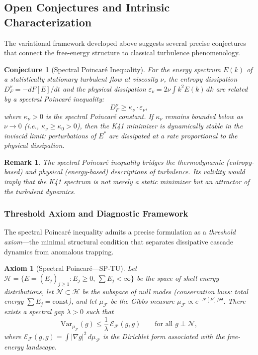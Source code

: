 \documentclass[12pt,a4paper]{article}
\theoremstyle{breakdef}
\theoremstyle{breakplain}
\newtheorem{conjecture}[definition]{Conjecture}
\newtheorem{axiom}[definition]{Axiom}
\theoremstyle{breakdef}
\newtheorem{remark}[definition]{Remark}
\begin{document}
\subsection{Open Conjectures and Intrinsic Characterization}\label{sec:open-conjectures}

The variational framework developed above suggests several precise conjectures
that connect the free-energy structure to classical turbulence phenomenology.

\begin{conjecture}[Spectral Poincaré Inequality]
\label{conj:spectral-poincare}
For the energy spectrum $E(k)$ of a statistically stationary turbulent flow at viscosity $\nu$, the entropy dissipation $D_F^\nu = -dF[E]/dt$ and the physical dissipation $\varepsilon_\nu = 2\nu \int k^2 E(k)\, dk$ are related by a spectral Poincaré inequality:
\[
D_F^\nu \geq \kappa_\nu \cdot \varepsilon_\nu,
\]
where $\kappa_\nu > 0$ is the spectral Poincaré constant. If $\kappa_\nu$ remains bounded below as $\nu \to 0$ (i.e., $\kappa_\nu \geq \kappa_0 > 0$), then the K41 minimizer is dynamically stable in the inviscid limit: perturbations of $E^*$ are dissipated at a rate proportional to the physical dissipation.
\end{conjecture}

\begin{remark}
The spectral Poincaré inequality bridges the thermodynamic (entropy-based) and physical (energy-based) descriptions of turbulence. Its validity would imply that the K41 spectrum is not merely a static minimizer but an attractor of the turbulent dynamics.
\end{remark}

\subsubsection*{Threshold Axiom and Diagnostic Framework}

The spectral Poincaré inequality admits a precise formulation as a \emph{threshold axiom}---the minimal structural condition that separates dissipative cascade dynamics from anomalous trapping.

\begin{axiom}[Spectral Poincaré---SP-TU]\label{ax:sp-tu}
Let $\mathcal{H} = \{E = (E_j)_{j \geq 1} : E_j \geq 0,\, \sum E_j < \infty\}$ be the space of shell energy distributions, let $\mathcal{N} \subset \mathcal{H}$ be the subspace of null modes (conservation laws: total energy $\sum E_j = \mathrm{const}$), and let $\mu_{\mathcal{F}}$ be the Gibbs measure $\mu_{\mathcal{F}} \propto e^{-\mathcal{F}[E]/\Theta}$. There exists a spectral gap $\lambda > 0$ such that
\begin{equation}\label{eq:sp-tu}
  \mathrm{Var}_{\mu_{\mathcal{F}}}(g) \leq \frac{1}{\lambda}\, \mathcal{E}_{\mathcal{F}}(g, g) \qquad \text{for all } g \perp \mathcal{N},
\end{equation}
where $\mathcal{E}_{\mathcal{F}}(g,g) = \int |\nabla g|^2\, d\mu_{\mathcal{F}}$ is the Dirichlet form associated with the free-energy landscape.
\end{axiom}
\end{document}
